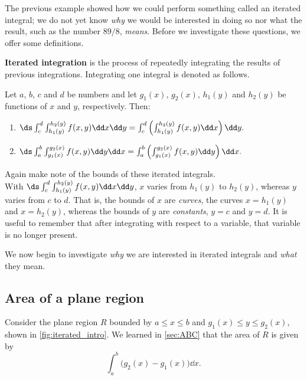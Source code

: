 The previous example showed how we could perform something called an iterated integral; we do not yet know \emph{why} we would be interested in doing so nor what the result, such as the number $89/8$, \emph{means}. Before we investigate these questions, we offer some definitions.

\begin{definition}\label{def:iterated_integral}
\textbf{Iterated integration} is the process of repeatedly integrating the results of previous integrations. Integrating one integral is denoted as follows.\bigskip

Let $a$, $b$, $c$ and $d$ be numbers and let $g_1(x)$, $g_2(x)$, $h_1(y)$ and $h_2(y)$ be functions of $x$ and $y$, respectively. Then:
\begin{enumerate}
	\item $\ds \int_c^d\int_{h_1(y)}^{h_2(y)} f(x,y)\dd x\dd y = \int_c^d\left(\int_{h_1(y)}^{h_2(y)} f(x,y)\dd x\right)\dd y.$
	\item $\ds \int_a^b\int_{g_1(x)}^{g_2(x)} f(x,y)\dd y\dd x = \int_a^b\left(\int_{g_1(x)}^{g_2(x)} f(x,y)\dd y\right)\dd x.$
\end{enumerate}
\end{definition}

Again make note of the bounds of these iterated integrals.\\
With $\ds \int_c^d\int_{h_1(y)}^{h_2(y)} f(x,y)\dd x\dd y$, $x$ varies from $h_1(y)$ to $h_2(y)$, whereas $y$ varies from $c$ to $d$. That is, the bounds of $x$ are \emph{curves}, the curves $x=h_1(y)$ and $x=h_2(y)$, whereas the bounds of $y$ are \emph{constants}, $y=c$ and $y=d$. It is useful to remember that
after integrating with respect to a variable, that variable is no longer present.

We now begin to investigate \emph{why} we are interested in iterated integrals and \emph{what} they mean.

\subsection{Area of a plane region}

Consider the plane region $R$ bounded by $a\leq x\leq b$ and $g_1(x)\leq y\leq g_2(x)$, shown in \autoref{fig:iterated_intro}. We learned in \autoref{sec:ABC} that the area of $R$ is given by 
\[\int_a^b \bigl(g_2(x)-g_1(x)\bigr)\dd x.\]


